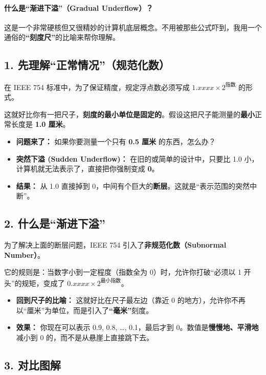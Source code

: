 \paragraph{什么是“渐进下溢”（Gradual Underflow）？}

这是一个非常硬核但又很精妙的计算机底层概念。不用被那些公式吓到，我用一个通俗的\textbf{“刻度尺”}的比喻来帮你理解。

\subsection*{1. 先理解“正常情况”（规范化数）}

在 IEEE 754 标准中，为了保证精度，规定浮点数必须写成 $1.xxxx \times 2^{\text{指数}}$ 的形式。

这就好比你有一把尺子，\textbf{刻度的最小单位是固定的}。假设这把尺子能测量的\textbf{最小}正常长度是 \textbf{1.0 厘米}。

\begin{itemize}
    \item \textbf{问题来了：} 如果你要测量一个只有 \textbf{0.5 厘米} 的东西，怎么办？
    \item \textbf{突然下溢 (Sudden Underflow)：} 在旧的或简单的设计中，只要比 1.0 小，计算机就无法表示了，直接把你强制变成 \textbf{0}。
    \item \textbf{结果：} 从 1.0 直接掉到 0，中间有个巨大的\textbf{断层}。这就是“表示范围的突然中断”。
\end{itemize}

\subsection*{2. 什么是“渐进下溢”}

为了解决上面的断层问题，IEEE 754 引入了\textbf{非规范化数（Subnormal Number）}。

它的规则是：当数字小到一定程度（指数全为 0）时，允许你打破“必须以 1 开头”的规矩，变成了 $0.xxxx \times 2^{\text{最小指数}}$。

\begin{itemize}
    \item \textbf{回到尺子的比喻：} 这就好比在尺子最左边（靠近 0 的地方），允许你不再以“厘米”为单位，而是引入了\textbf{“毫米”}刻度。
    \item \textbf{效果：} 你现在可以表示 0.9, 0.8, \dots, 0.1，最后才到 0。数值是\textbf{慢慢地、平滑地}减小到 0 的，而不是从悬崖上直接跳下去。
\end{itemize}

\subsection*{3. 对比图解}

